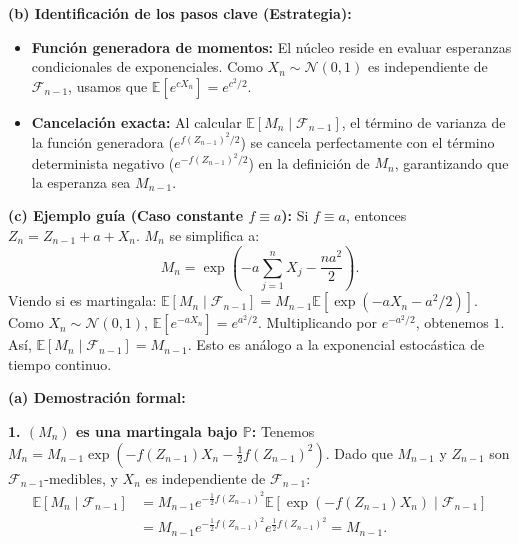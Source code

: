 \documentclass[11pt, letterpaper]{article}
\begin{document}
\vspace{5mm}

\begin{solucion}
    \textbf{(b) Identificación de los pasos clave (Estrategia):}
    \begin{itemize}
        \item[(i)] \textbf{Función generadora de momentos:} El núcleo reside en evaluar esperanzas condicionales de exponenciales. Como $X_n \sim \mathcal{N}(0,1)$ es independiente de $\mathcal{F}_{n-1}$, usamos que $\mathbb{E}[e^{cX_n}] = e^{c^2/2}$.
        \item[(ii)] \textbf{Cancelación exacta:} Al calcular $\mathbb{E}[M_n \mid \mathcal{F}_{n-1}]$, el término de varianza de la función generadora ($e^{f(Z_{n-1})^2/2}$) se cancela perfectamente con el término determinista negativo ($e^{-f(Z_{n-1})^2/2}$) en la definición de $M_n$, garantizando que la esperanza sea $M_{n-1}$.
    \end{itemize}

    \vspace{3mm}
    \textbf{(c) Ejemplo guía (Caso constante $f \equiv a$):}
    Si $f \equiv a$, entonces $Z_n = Z_{n-1} + a + X_n$. $M_n$ se simplifica a:
    \[ M_n = \exp\left(-a \sum_{j=1}^n X_j - \frac{n a^2}{2}\right). \]
    Viendo si es martingala: $\mathbb{E}[M_n \mid \mathcal{F}_{n-1}] = M_{n-1} \mathbb{E}[\exp(-a X_n - a^2/2)]$.
    Como $X_n \sim \mathcal{N}(0,1)$, $\mathbb{E}[e^{-a X_n}] = e^{a^2/2}$. Multiplicando por $e^{-a^2/2}$, obtenemos $1$. Así, $\mathbb{E}[M_n \mid \mathcal{F}_{n-1}] = M_{n-1}$. Esto es análogo a la exponencial estocástica de tiempo continuo.

    \vspace{3mm}
    \textbf{(a) Demostración formal:}
    
    \textbf{1. $(M_n)$ es una martingala bajo $\mathbb{P}$:}
    Tenemos $M_n = M_{n-1} \exp\left(-f(Z_{n-1})X_n - \frac{1}{2}f(Z_{n-1})^2\right)$.
    Dado que $M_{n-1}$ y $Z_{n-1}$ son $\mathcal{F}_{n-1}$-medibles, y $X_n$ es independiente de $\mathcal{F}_{n-1}$:
    \begin{align*}
        \mathbb{E}[M_n \mid \mathcal{F}_{n-1}] &= M_{n-1} e^{-\frac{1}{2}f(Z_{n-1})^2} \mathbb{E}\left[\exp(-f(Z_{n-1})X_n) \mid \mathcal{F}_{n-1}\right] \\
        &= M_{n-1} e^{-\frac{1}{2}f(Z_{n-1})^2} e^{\frac{1}{2}f(Z_{n-1})^2} = M_{n-1}.
    \end{align*}


\end{solucion}
\end{document}
